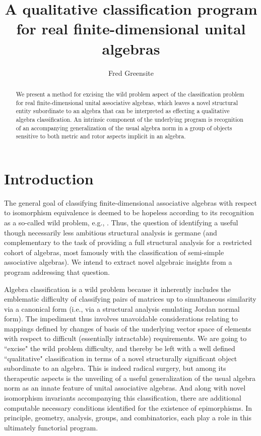 \documentclass{amsart}
\numberwithin{equation}{section}
\theoremstyle{definition}
\numberwithin{theorem}{section}
\begin{document}
       
             \title{A qualitative classification program for real finite-dimensional unital algebras}
    \author{Fred Greensite}
    
   \begin{abstract} We present a method for excising the wild problem aspect of the classification problem for real finite-dimensional unital associative algebras, which leaves a novel structural entity subordinate to an algebra that can be interpreted as effecting a qualitative algebra classification.  An intrinsic component of the underlying program is recognition of an accompanying generalization of the usual algebra norm in a group of objects sensitive to both metric and rotor aspects implicit in an algebra.  \end{abstract}
        
  \maketitle
  
 

 
  \section{Introduction} The general goal of classifying finite-dimensional associative algebras with respect to isomorphism equivalence is deemed to be hopeless according to its recognition as a so-called wild problem, e.g., \cite{eom:2024,drozd:1972,belitskii:2005}.   
      Thus, the question of identifying a useful though necessarily less ambitious structural analysis is germane (and complementary to the task of providing a full structural analysis for a restricted cohort of algebras, most famously with the classification of semi-simple associative algebras).  We intend to extract novel algebraic insights from a program addressing that question.  
      
Algebra classification is a wild problem because it inherently includes the emblematic difficulty of classifying pairs of matrices up to simultaneous similarity via a canonical form (i.e., via a structural analysis emulating Jordan normal form).   The impediment thus involves unavoidable considerations relating to mappings defined by changes of basis of the underlying vector space of elements with respect to difficult (essentially intractable) requirements.  We are going to ``excise" the wild problem difficulty, and thereby be left with a well defined ``qualitative" classification in terms of a novel structurally significant object subordinate to an algebra.  This is indeed radical surgery, but among its therapeutic aspects is the unveiling of a useful generalization of the usual algebra norm as an innate feature of unital associative algebras.  And along with novel isomorphism invariants accompanying this classification, there are additional computable necessary conditions identified for the existence of epimorphisms.  In principle, geometry, analysis, groups, and combinatorics, each play a role in this ultimately functorial program.  
\end{document}
